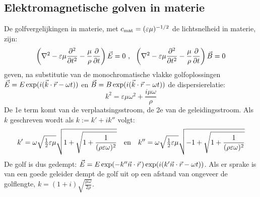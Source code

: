 \documentclass[twoside]{report}
\begin{document}
\subsection{Elektromagnetische golven in materie}
De golfvergelijkingen in materie, met $c_{\rm mat}=(\varepsilon\mu)^{-1/2}$
de lichtsnelheid in materie, zijn:
\[
\left(\nabla^2-\varepsilon\mu\frac{\partial^2 }{\partial t^2}-\frac{\mu}{\rho}\frac{\partial }{\partial t}\right)\vec{E}=0~,~~
\left(\nabla^2-\varepsilon\mu\frac{\partial^2 }{\partial t^2}-\frac{\mu}{\rho}\frac{\partial }{\partial t}\right)\vec{B}=0
\]
geven, na substitutie van de monochromatische vlakke golfoplossingen
$\vec{E}=E\exp(i(\vec{k}\cdot\vec{r}-\omega t))$ en
$\vec{B}=B\exp(i(\vec{k}\cdot\vec{r}-\omega t))$ de dispersierelatie:
\[
k^2=\varepsilon\mu\omega^2+\frac{i\mu\omega}{\rho}
\]
De 1e term komt van de verplaatsingsstroom, de 2e van de geleidingsstroom.
Als $k$ geschreven wordt als $k:=k'+ik''$ volgt:
\[
k'=\omega\sqrt{\mbox{$\frac{1}{2}$}\varepsilon\mu}\sqrt{1+\sqrt{1+\frac{1}{(\rho\varepsilon\omega)^2}}}~~~\mbox{en}~~~
k''=\omega\sqrt{\mbox{$\frac{1}{2}$}\varepsilon\mu}\sqrt{-1+\sqrt{1+\frac{1}{(\rho\varepsilon\omega)^2}}}
\]
De golf is dus gedempt: $\vec{E}=E\exp(-k''\vec{n}\cdot\vec{r}\,)\exp(i(k'\vec{n}\cdot\vec{r}-\omega t))$.
Als er sprake is van een goede geleider dempt de golf uit op een afstand van
ongeveer de golflengte, $\displaystyle k=(1+i)\sqrt{\frac{\mu\omega}{2\rho}}$.
\end{document}
